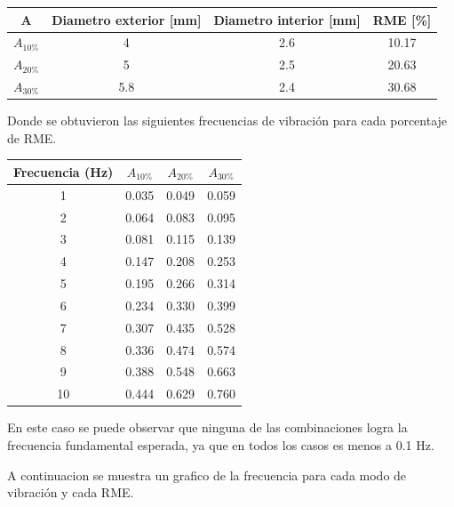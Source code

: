 \begin{table}[H]
    \centering
    \begin{tabular}{cccc}
    \toprule
     A & Diametro exterior [mm] & Diametro interior [mm] & RME [\%] \\
    \midrule
     $A_{10\%}$ &  4 &  2.6 &  10.17 \\
     $A_{20\%}$ &  5 &  2.5 &  20.63 \\
     $A_{30\%}$ &  5.8 &  2.4 &  30.68 \\
    \bottomrule
    \end{tabular}
\end{table}

Donde se obtuvieron las siguientes frecuencias de vibración para cada porcentaje de RME.

\begin{table}[H]
    \centering
    \begin{tabular}{cccc}
    \toprule
     Frecuencia (Hz) & $A_{10\%}$ & $A_{20\%}$ & $A_{30\%}$ \\
    \midrule
     1 &       0.035 &       0.049 &       0.059 \\
     2 &       0.064 &       0.083 &       0.095 \\
     3 &       0.081 &       0.115 &       0.139 \\
     4 &       0.147 &       0.208 &       0.253 \\
     5 &       0.195 &       0.266 &       0.314 \\
     6 &       0.234 &       0.330 &       0.399 \\
     7 &       0.307 &       0.435 &       0.528 \\
     8 &       0.336 &       0.474 &       0.574 \\
     9 &       0.388 &       0.548 &       0.663 \\
     10 &       0.444 &       0.629 &       0.760 \\
    \bottomrule
    \end{tabular}
\end{table}

En este caso se puede observar que ninguna de las combinaciones logra la frecuencia fundamental esperada, ya que en todos los casos es menos a 0.1 Hz.

A continuacion se muestra un grafico de la frecuencia para cada modo de vibración y cada RME. 

